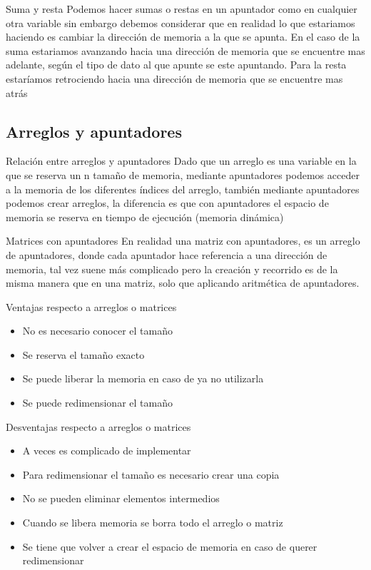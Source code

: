 \documentclass{beamer}
\begin{document}
\begin{frame}{Suma y resta}
	Podemos hacer sumas o restas en un apuntador como en cualquier otra variable sin embargo debemos considerar que en realidad lo que estariamos haciendo es cambiar la direcci\'on de memoria a la que se apunta.
	En el caso de la suma estariamos avanzando hacia una direcci\'on de memoria que se encuentre mas adelante, seg\'un el tipo de dato al que apunte se este apuntando.
	Para la resta estar\'iamos retrociendo hacia una direcci\'on de memoria que se encuentre mas atr\'as
\end{frame}

\subsection{Arreglos y apuntadores}

\begin{frame}{Relaci\'on entre arreglos y apuntadores}
	Dado que un arreglo es una variable en la que se reserva un n tamaño de memoria, mediante apuntadores podemos acceder a la memoria de los diferentes \'indices del arreglo, tambi\'en mediante apuntadores podemos crear arreglos, la diferencia es que con apuntadores el espacio de memoria se reserva en tiempo de ejecuci\'on (memoria din\'amica)
\end{frame}

\begin{frame}{Matrices con apuntadores}
	En realidad una matriz con apuntadores, es un arreglo de apuntadores, donde cada apuntador hace referencia a una direcci\'on de memoria, tal vez suene m\'as complicado pero la creaci\'on y recorrido es de la misma manera que en una matriz, solo que aplicando aritm\'etica de apuntadores.
\end{frame}

\begin{frame}{Ventajas respecto a arreglos o matrices}
	\begin{itemize}
		\item No es necesario conocer el tamaño
		\item Se reserva el tamaño exacto
		\item Se puede liberar la memoria en caso de ya no utilizarla
		\item Se puede redimensionar el tamaño
	\end{itemize}
\end{frame}

\begin{frame}{Desventajas respecto a arreglos o matrices}
	\begin{itemize}
		\item A veces es complicado de implementar 
		\item Para redimensionar el tamaño es necesario crear una copia
		\item No se pueden eliminar elementos intermedios
		\item Cuando se libera memoria se borra todo el arreglo o matriz
		\item Se tiene que volver a crear el espacio de memoria en caso de querer redimensionar
	\end{itemize}
\end{frame}
\end{document}
